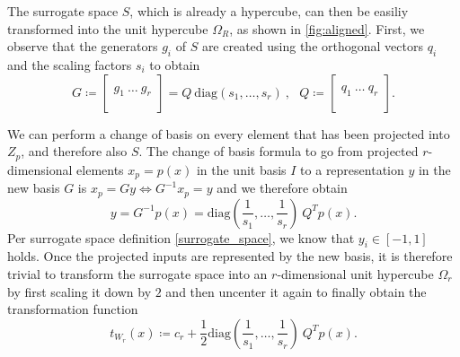 \documentclass[
  a4paper,  %
  twoside,  %
  bibliography=totoc,
  headsepline,
  cleardoublepage=empty,
  parskip=half,
  draft=false
]{scrbook}
\begin{document}
The surrogate space $S$, which is already a hypercube, can then be easiliy transformed into the unit hypercube $\Omega_R$, as shown in \cref{fig:aligned}.
First, we observe that the generators $g_i$ of $S$ are created using the orthogonal vectors $q_i$ and the scaling factors $s_i$ to obtain
\begin{equation}
G \coloneqq \begin{bmatrix}
  \\
    g_1 ~ \dots  ~ g_r\\
    \\
  \end{bmatrix}=Q ~ \text{diag}(s_1, \dots, s_r) ~, ~~~
Q \coloneqq \begin{bmatrix}
  \\
    q_1 ~ \dots  ~ q_r\\
    \\
  \end{bmatrix}.
\end{equation}

We can perform a change of basis on every element that has been projected into $Z_p$, and therefore also $S$.
The change of basis formula to go from projected $r$-dimensional elements $x_p=p(x)$ in the unit basis $I$ to a representation $y$ in the new basis $G$ is $x_p=Gy \Leftrightarrow G^{-1} x_p=y$ and we therefore obtain
\begin{equation}
y=G^{-1} p(x)=\text{diag}\left(\frac{1}{s_1}, \dots, \frac{1}{s_r}\right) ~Q^T p(x).
\label{alignment}
\end{equation}
Per surrogate space definition \cref{surrogate_space}, we know that $y_i \in [-1,1]$ holds.
Once the projected inputs are represented by the new basis, it is therefore trivial to transform the surrogate space into an $r$-dimensional unit hypercube $\Omega_r$ by first scaling it down by $2$ and then uncenter it again to finally obtain the transformation function
\begin{equation}
t_{W_r}(x) \coloneqq c_r + \frac{1}{2} \text{diag}\left(\frac{1}{s_1}, \dots, \frac{1}{s_r}\right) ~Q^T p(x).
\label{linear_trans}
\end{equation}
\end{document}
